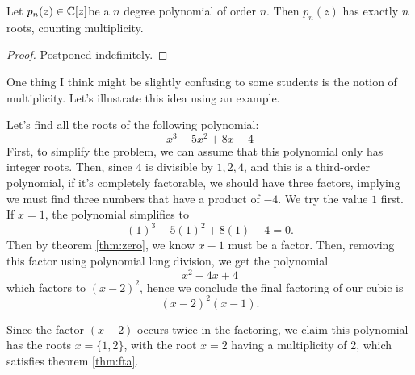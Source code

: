 \begin{theorem}
\label{thm:fta}
	Let $p_n(z)\in \mathbb{C}[z]$\footnotemark be a $n$ degree polynomial of order $n$. Then $p_n(z)$ has exactly $n$ roots, counting multiplicity.
\end{theorem}
\addtocounter{footnote}{-1}

\begin{proof}
	Postponed indefinitely.
\end{proof}

One thing I think might be slightly confusing to some students is the notion of multiplicity. Let's illustrate this idea using an example.
\begin{ex}
Let's find all the roots of the following polynomial:
$$x^3-5 x^2+8 x-4$$
First, to simplify the problem, we can assume that this polynomial only has integer roots. Then, since $4$ is divisible by $1,2,4$, and this is a third-order polynomial, if it's completely factorable, we should have three factors, implying we must find three numbers that have a product of $-4$. We try the value $1$ first. If $x=1$, the polynomial simplifies to
$$(1)^3-5(1)^2+8(1)-4=0.$$
Then by theorem \eqref{thm:zero}, we know $x-1$ must be a factor.
Then, removing this factor using polynomial long division, we get the polynomial
$$x^2-4x+4$$
which factors to $(x-2)^2$, hence we conclude the final factoring of our cubic is
$$(x-2)^2(x-1).$$

Since the factor $(x-2)$ occurs twice in the factoring, we claim this polynomial has the roots $x=\{1,2\}$, with the root $x=2$ having a multiplicity of 2, which satisfies theorem \eqref{thm:fta}.
\end{ex}

